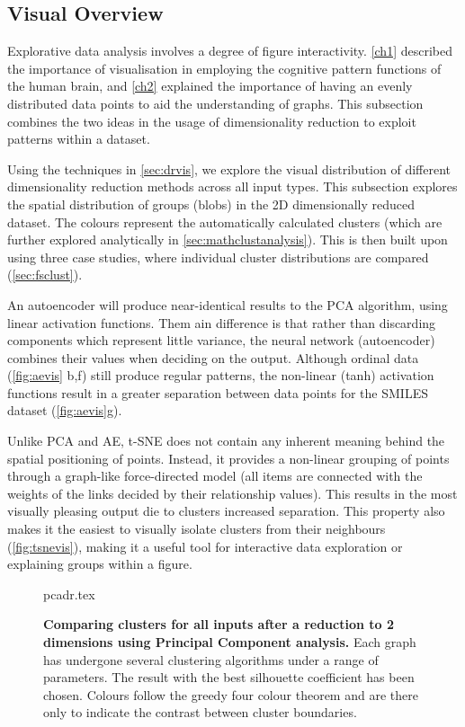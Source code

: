%

\subsection{Visual Overview}\label{sec:cldist}

Explorative data analysis involves a degree of figure interactivity. \autoref{ch1} described the importance of visualisation in employing the cognitive pattern functions of the human brain, and \autoref{ch2} explained the importance of having an evenly distributed data points to aid the understanding of graphs. This subsection combines the two ideas in the usage of dimensionality reduction to exploit patterns within a dataset.

Using the techniques in \autoref{sec:drvis}, we explore the visual distribution of different dimensionality reduction methods across all input types. This subsection explores the spatial distribution of groups (blobs) in the 2D dimensionally reduced dataset. The colours represent the automatically calculated clusters (which are further explored analytically in \autoref{sec:mathclustanalysis}).
This is then built upon using three case studies, where individual cluster distributions are compared (\autoref{sec:fsclust}).


An autoencoder will produce near-identical results to the PCA algorithm, using linear activation functions. Them ain difference is that rather than discarding components which represent little variance, the neural network (autoencoder) combines their values when deciding on the output. Although ordinal data (\autoref{fig:aevis} b,f) still produce regular patterns, the non-linear (tanh) activation functions result in a greater separation between data points for the SMILES dataset (\autoref{fig:aevis}g).

Unlike PCA and AE, t-SNE does not contain any inherent meaning behind the spatial positioning of points. Instead, it provides a non-linear grouping of points through a graph-like force-directed model (all items are connected with the weights of the links decided by their relationship values). This results in the most visually pleasing output die to clusters increased separation. This property also makes it the easiest to visually isolate clusters from their neighbours (\autoref{fig:tsnevis}), making it a useful tool for interactive data exploration or explaining groups within a figure.


\begin{landscape}
\begin{figure}[H]
    {pcadr.tex}
    \caption{\textbf{Comparing clusters for all inputs after a reduction to 2 dimensions using Principal Component analysis.}
    Each graph has undergone several clustering algorithms under a range of parameters. The result with the best silhouette coefficient has been chosen. Colours follow the greedy four colour theorem and are there only to indicate the contrast between cluster boundaries.}
    \label{fig:pcavis}
\end{figure}
\end{landscape}


